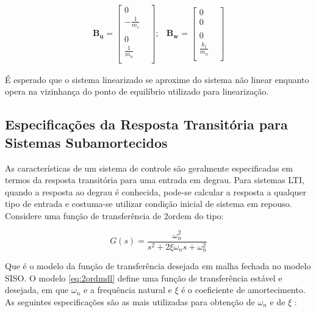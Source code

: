 \begin{equation} \label{ed:linsys:BuBw}
    \begin{split}
        \mathbf{B_u} = 
        \begin{bmatrix}
            0 & \\            
            -\frac{1}{m_s}&\\ \\  
            0 & \\
            \frac{1}{m_u}&\\
        \end{bmatrix};
    \end{split}
    \begin{split}
        \mathbf{B_w} = 
        \begin{bmatrix}
            0 & \\            
            0 &\\ \\  
            0 & \\
            \frac{k_t}{m_u}& \\
        \end{bmatrix}
    \end{split}
\end{equation}
    
É esperado que o  sistema linearizado se aproxime do sistema não linear enquanto opera na vizinhança do ponto de equilíbrio utilizado para linearização. 
   
\subsection{Especificações da Resposta Transitória para Sistemas Subamortecidos}
As características de um sistema de controle são geralmente especificadas em termos da resposta transitória para uma entrada em degrau. Para sistemas LTI, quando a resposta ao degrau é conhecida, pode-se calcular a resposta a qualquer tipo de entrada e costuma-se utilizar condição inicial de sistema em repouso. 
Considere uma função de transferência de 2\textdegree ordem do tipo:

\begin{equation} \label{eq:2ordmdl}
  G(s) = \frac{\omega^2_n}{s^2+2\xi \omega_ns +\omega^2_n}
\end{equation}

Que é o modelo da função de transferência desejada em malha 
fechada no modelo SISO. O modelo \eqref{eq:2ordmdl} define uma função de transferência estável e desejada, em que $\omega_n$ e a frequência natural e $\xi$ é o coeficiente de amortecimento.
As seguintes especificações são as mais utilizadas para obtenção de $\omega_n$ e de $\xi$ :

